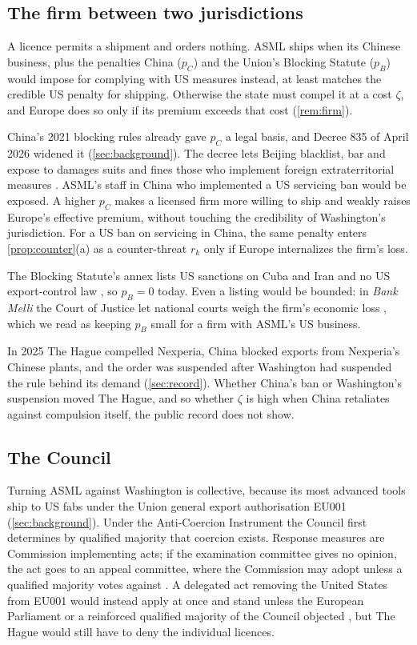 \subsection{The firm between two jurisdictions}\label{sec:firm}

A licence permits a shipment and orders nothing. ASML ships when its Chinese business, plus the penalties China ($p_C$) and the Union's Blocking Statute ($p_B$) would impose for complying with US measures instead, at least matches the credible US penalty for shipping. Otherwise the state must compel it at a cost $\zeta$, and Europe does so only if its premium exceeds that cost (\cref{rem:firm}).

China's 2021 blocking rules already gave $p_C$ a legal basis, and Decree 835 of April 2026 widened it (\cref{sec:background}). The decree lets Beijing blacklist, bar and expose to damages suits and fines those who implement foreign extraterritorial measures \citep{reedsmith2026decree}. ASML's staff in China who implemented a US servicing ban would be exposed. A higher $p_C$ makes a licensed firm more willing to ship and weakly raises Europe's effective premium, without touching the credibility of Washington's jurisdiction. For a US ban on servicing in China, the same penalty enters \cref{prop:counter}(a) as a counter-threat $r_k$ only if Europe internalizes the firm's loss.

The Blocking Statute's annex lists US sanctions on Cuba and Iran and no US export-control law \citep{eu1996blocking, ec2018blocking}, so $p_B=0$ today. Even a listing would be bounded: in \emph{Bank Melli} the Court of Justice let national courts weigh the firm's economic loss \citep{cjeu2021bankmelli}, which we read as keeping $p_B$ small for a firm with ASML's US business.

In 2025 The Hague compelled Nexperia, China blocked exports from Nexperia's Chinese plants, and the order was suspended after Washington had suspended the rule behind its demand (\cref{sec:record}). Whether China's ban or Washington's suspension moved The Hague, and so whether $\zeta$ is high when China retaliates against compulsion itself, the public record does not show.

\subsection{The Council}\label{sec:council}

Turning ASML against Washington is collective, because its most advanced tools ship to US fabs under the Union general export authorisation EU001 (\cref{sec:background}). Under the Anti-Coercion Instrument the Council first determines by qualified majority that coercion exists. Response measures are Commission implementing acts; if the examination committee gives no opinion, the act goes to an appeal committee, where the Commission may adopt unless a qualified majority votes against \citep{eu2023aci, eu2011comitology}. A delegated act removing the United States from EU001 would instead apply at once and stand unless the European Parliament or a reinforced qualified majority of the Council objected \citep{eu2021dualuse, eu2016tfeu}, but The Hague would still have to deny the individual licences.

